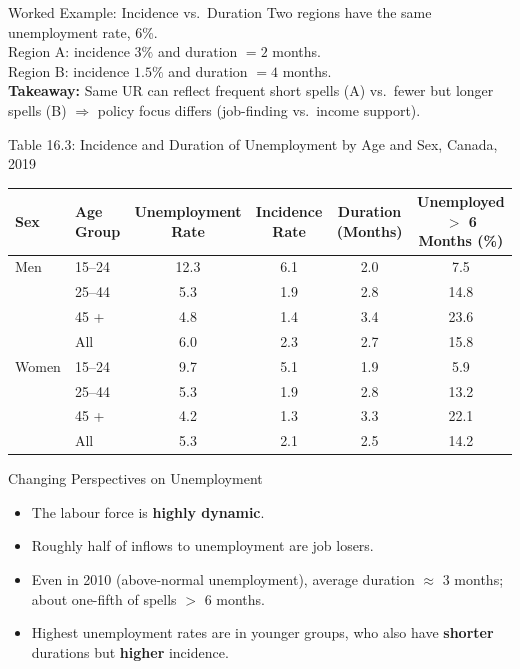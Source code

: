 \documentclass[aspectratio=169]{beamer}
\begin{document}
\begin{frame}{Worked Example: Incidence vs.\ Duration}
\transfade
\small
Two regions have the same unemployment rate, 6\%.\\
Region A: incidence $3\%$ and duration $= 2$ months.\\
Region B: incidence $1.5\%$ and duration $= 4$ months.\\[0.4em]
\textbf{Takeaway:} Same UR can reflect frequent short spells (A) vs.\ fewer but longer spells (B) $\Rightarrow$ policy focus differs (job-finding vs.\ income support).
\end{frame}

\begin{frame}{Table 16.3: Incidence and Duration of Unemployment by Age and Sex, Canada, 2019}
\transfade
\scriptsize
\begin{tabular}{llcccc}
\toprule
\textbf{Sex} & \textbf{Age Group} & \textbf{Unemployment Rate} & \textbf{Incidence Rate} & \textbf{Duration (Months)} & \textbf{Unemployed $>$ 6 Months (\%)} \\
\midrule
Men & 15--24 & 12.3 & 6.1 & 2.0 & 7.5 \\
 & 25--44 & 5.3 & 1.9 & 2.8 & 14.8 \\
 & 45 + & 4.8 & 1.4 & 3.4 & 23.6 \\
 & All & 6.0 & 2.3 & 2.7 & 15.8 \\
\midrule
Women & 15--24 & 9.7 & 5.1 & 1.9 & 5.9 \\
 & 25--44 & 5.3 & 1.9 & 2.8 & 13.2 \\
 & 45 + & 4.2 & 1.3 & 3.3 & 22.1 \\
 & All & 5.3 & 2.1 & 2.5 & 14.2 \\
\bottomrule
\end{tabular}
\end{frame}

\begin{frame}{Changing Perspectives on Unemployment}
\transfade
\begin{itemize}[<+->]
  \item The labour force is \textbf{highly dynamic}.
  \item Roughly half of inflows to unemployment are job losers.
  \item Even in 2010 (above-normal unemployment), average duration $\approx$ 3 months; about one-fifth of spells $>$ 6 months.
  \item Highest unemployment rates are in younger groups, who also have \textbf{shorter} durations but \textbf{higher} incidence.
\end{itemize}
\end{frame}
\end{document}
